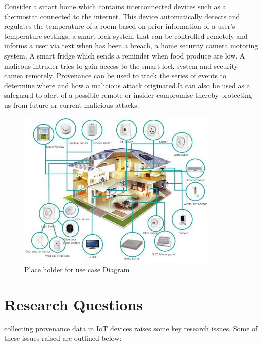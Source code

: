 Consider a smart home which contains interconnected devices such as a thermostat connected to the internet. This device automatically detects and regulates the temperature of a room based on prior information of a user's temperature settings, a smart lock system that can be controlled remotely and informs a user via text when has been a breach, a home security camera motoring system, A smart fridge which sends a reminder when food produce are low. A malicous intruder tries to gain access to the smart lock system and security camea remotely. Provenance can be used to track the series  of events to determine where and how a malicious attack originated.It can also be used as a safeguard to alert of a possible remote or insider compromise thereby protecting us from future or current malicious attacks.

\begin{figure}[h]
\begin{center}

\includegraphics[height=3in]{smarthome-diagram.png}
\end{center}
\caption{Place holder for use case Diagram}

\end{figure}




\section{Research Questions}
collecting provenance data in IoT devices raises some key research issues. Some of these issues raised are outlined below:

